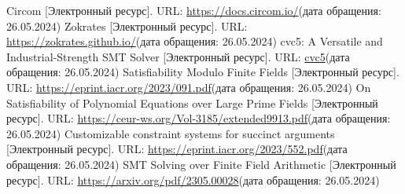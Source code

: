 \documentclass[a4paper]{article}
\begin{document}
\begin{thebibliography}{}
      Circom [Электронный ресурс]. URL: \href{https://docs.circom.io/}{https://docs.circom.io/}(дата обращения: 26.05.2024)
      Zokrates [Электронный ресурс]. URL: \href{https://zokrates.github.io/}{https://zokrates.github.io/}(дата обращения: 26.05.2024)
      cvc5: A Versatile and Industrial-Strength SMT Solver [Электронный ресурс]. URL: \href{https://link.springer.com/chapter/10.1007/978-3-030-99524-9_24}{cvc5}(дата обращения: 26.05.2024)
      Satisfiability Modulo Finite Fields [Электронный ресурс]. URL: \href{https://eprint.iacr.org/2023/091.pdf}{https://eprint.iacr.org/2023/091.pdf}(дата обращения: 26.05.2024)
      On Satisfiability of Polynomial Equations over Large Prime Fields [Электронный ресурс]. URL: \href{https://ceur-ws.org/Vol-3185/extended9913.pdf}{https://ceur-ws.org/Vol-3185/extended9913.pdf}(дата обращения: 26.05.2024)
      Customizable constraint systems for succinct arguments [Электронный ресурс]. URL: \href{https://eprint.iacr.org/2023/552.pdf}{https://eprint.iacr.org/2023/552.pdf}(дата обращения: 26.05.2024)
      SMT Solving over Finite Field Arithmetic [Электронный ресурс]. URL: \href{https://arxiv.org/pdf/2305.00028}{https://arxiv.org/pdf/2305.00028}(дата обращения: 26.05.2024)
\end{thebibliography}
\end{document}
